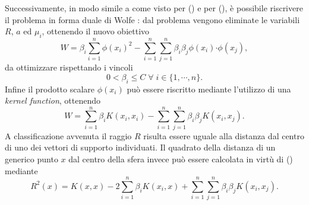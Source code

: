 \documentclass [11pt,a4paper,twoside,openright] {book}
\begin{document}
Successivamente, in modo simile a come visto per () e per (), è possibile riscrivere il problema in forma duale di Wolfe \cite{wolfe1961duality}: dal problema vengono eliminate le variabili $R$, $a$ ed $\mu_i$, ottenendo il nuovo obiettivo
\begin{equation}
W = \beta_i\sum_{i=1}^n\phi(x_i)^2 - \sum_{i=1}^n\sum_{j=1}^n\beta_i\beta_j\phi(x_i)\boldsymbol{\cdot}\phi(x_j),
\end{equation}
da ottimizzare rispettando i vincoli
\begin{equation}
0 < \beta_i \leq C \; \forall \; i \in \lbrace 1, \cdots, n \rbrace.
\end{equation}
Infine il prodotto scalare $\phi(x_i)$ può essere riscritto mediante l'utilizzo di una \textit{kernel function}, ottenendo
\begin{equation}
W = \sum_{i=1}^n\beta_iK(x_i,x_i) - \sum_{i=1}^n\sum_{j=1}^n\beta_i\beta_jK(x_i,x_j).
\end{equation}
A classificazione avvenuta il raggio $R$ risulta essere uguale alla distanza dal centro di uno dei vettori di supporto individuati. Il quadrato della distanza di un generico punto $x$ dal centro della sfera invece può essere calcolata in virtù di () mediante
\begin{equation}\label{r}
R^2(x) = K(x,x) - 2 \sum_{i=1}^n \beta_i K(x_i,x) + \sum_{i=1}^n\sum_{j=1}^n\beta_i\beta_jK(x_i,x_j).
\end{equation}
\end{document}
